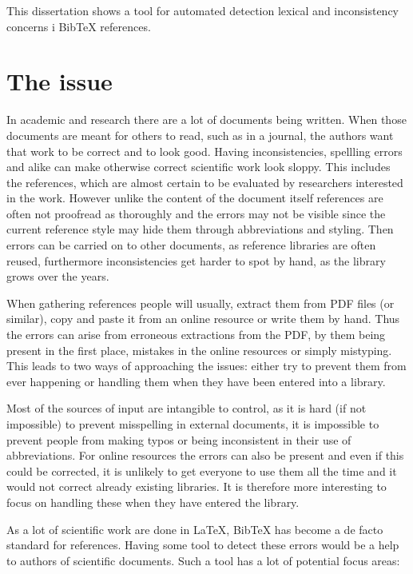 
This dissertation shows a tool for automated detection lexical
and inconsistency concerns i Bib{\TeX} references.


\section{The issue}

In academic and research there are a lot of documents being written.
When those documents are meant for others to read, such as in a
journal, the authors want that work to be correct and to look good.
Having inconsistencies, spellling errors and alike can make otherwise
correct scientific work look sloppy.  This includes the references,
which are almost certain to be evaluated by researchers interested in
the work.  However unlike the content of the document itself
references are often not proofread as thoroughly and the errors may
not be visible since the current reference style may hide them through
abbreviations and styling.  Then errors can be carried on to other
documents, as reference libraries are often reused, furthermore
inconsistencies get harder to spot by hand, as the library grows over
the years.

When gathering references people will usually, extract them from PDF
files (or similar), copy and paste it from an online resource or write
them by hand.  Thus the errors can arise from erroneous extractions
from the PDF, by them being present in the first place, mistakes in
the online resources or simply mistyping.  This leads to two ways of
approaching the issues: either try to prevent them from ever happening
or handling them when they have been entered into a library.

Most of the sources of input are intangible to control, as it is hard
(if not impossible) to prevent misspelling in external documents, it
is impossible to prevent people from making typos or being
inconsistent in their use of abbreviations.  For online resources the
errors can also be present and even if this could be corrected, it is
unlikely to get everyone to use them all the time and it would not
correct already existing libraries.  It is therefore more
interesting to focus on handling these when they have entered the
library.

As a lot of  scientific work are done in
{\LaTeX}, Bib{\TeX} has become a de facto standard for
references.  Having some tool to detect these errors would be a help
to authors of scientific documents.  Such a tool has a lot of
potential focus areas:

